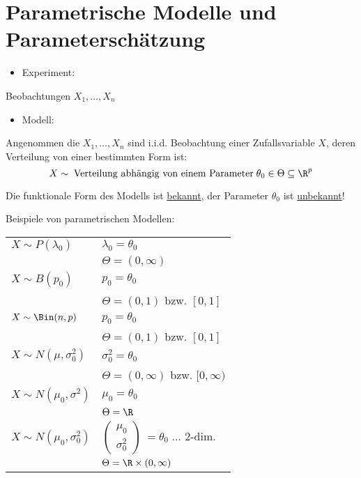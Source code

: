\documentclass{tstextbook}
\begin{document}
\section{Parametrische Modelle und Parameterschätzung}
		\label{parameterschaetzung}


\begin{itemize}
	\item Experiment:
\end{itemize}
Beobachtungen $ X_1,\ldots,X_n $\\

\begin{itemize}
	\item Modell:
\end{itemize}
Angenommen die $ X_1,\ldots,X_n $ sind i.i.d. Beobachtung einer Zufallsvariable $ X $, deren 
Verteilung von einer bestimmten Form ist:
	\[
	X\sim \; \text{Verteilung abhängig von einem Parameter} \; \theta_0 \in \Theta \subseteq \R^p
	\]
	
Die funktionale Form des Modells ist \underline{bekannt}, der Parameter $ \theta_0 $ ist \underline{unbekannt}!

\begin{example}
	Beispiele von parametrischen Modellen: \\
	
	\begin{center}
	\begin{tabular}{l|l}
			$ X\sim P(\lambda_0) $ 	& $ \lambda_0 = \theta_0 $ 				 \\
									& $ \Theta = \left(0,\infty\right) $ 	\\
			\midrule
			$ X\sim B(p_0) $		& $ p_0= \theta_0 $							\\
									& $ \Theta = \left(0,1\right) $ bzw. $ \left[0,1\right] $  \\
			\midrule
			$ X\sim \Bin(n,p)  $	& $ p_0= \theta_0 $						\\
			& $ \Theta = \left(0,1\right) $ bzw. $ \left[0,1\right] $  \\	
			\midrule
			$ X \sim N(\mu,\sigma_0^2) $ & $ \sigma_0^2 = \theta_0 $	 \\
									& $ \Theta = \left(0,\infty\right) $ bzw. $ [0,\infty) $  \\
			\midrule
			$ X \sim N(\mu_0,\sigma^2) $ & $ \mu_0 = \theta_0 $  \\
			& $ \Theta = \R $  \\
			\midrule
			$ X \sim N(\mu_0,\sigma_0^2) $ & $ \begin{pmatrix}
				\mu_0 \\ \sigma_0^2
			\end{pmatrix}\ = \theta_0 \; \ldots $ 2-dim.	 \\
			& $ \Theta = \R \times (0,\infty) $   		
		\end{tabular}
	\end{center}

\end{example}
\end{document}
